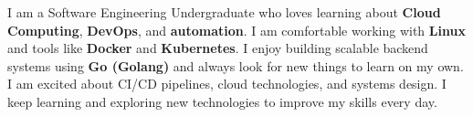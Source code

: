 
\begin{cvparagraph}

I am a Software Engineering Undergraduate who loves learning about \textbf{Cloud Computing}, \textbf{DevOps}, and \textbf{automation}. I am comfortable working with \textbf{Linux} and tools like \textbf{Docker} and \textbf{Kubernetes}. I enjoy building scalable backend systems using \textbf{Go (Golang)} and always look for new things to learn on my own. I am excited about CI/CD pipelines, cloud technologies, and systems design. I keep learning and exploring new technologies to improve my skills every day.

\end{cvparagraph}
